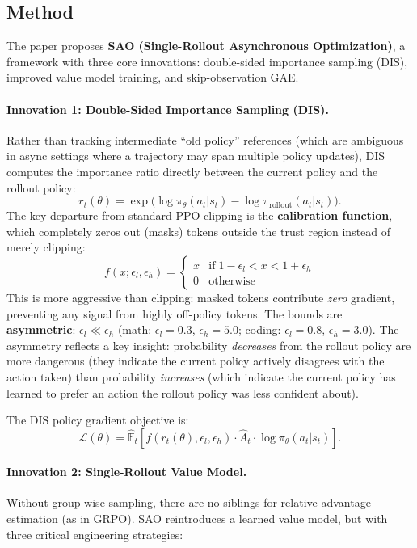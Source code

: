 \documentclass[11pt,a4paper]{article}
\begin{document}
\subsection{Method}

The paper proposes \textbf{SAO (Single-Rollout Asynchronous Optimization)}, a framework with three core innovations: double-sided importance sampling (DIS), improved value model training, and skip-observation GAE.

\paragraph{Innovation 1: Double-Sided Importance Sampling (DIS).} Rather than tracking intermediate ``old policy'' references (which are ambiguous in async settings where a trajectory may span multiple policy updates), DIS computes the importance ratio directly between the current policy and the rollout policy:
\[
r_t(\theta) = \exp\!\big(\log \pi_\theta(a_t | s_t) - \log \pi_{\mathrm{rollout}}(a_t | s_t)\big).
\]
The key departure from standard PPO clipping is the \textbf{calibration function}, which completely zeros out (masks) tokens outside the trust region instead of merely clipping:
\[
f(x; \epsilon_l, \epsilon_h) = \begin{cases} x & \mathrm{if}\; 1 - \epsilon_l < x < 1 + \epsilon_h \\ 0 & \mathrm{otherwise} \end{cases}
\]
This is more aggressive than clipping: masked tokens contribute \emph{zero} gradient, preventing any signal from highly off-policy tokens. The bounds are \textbf{asymmetric}: $\epsilon_l \ll \epsilon_h$ (math: $\epsilon_l = 0.3$, $\epsilon_h = 5.0$; coding: $\epsilon_l = 0.8$, $\epsilon_h = 3.0$). The asymmetry reflects a key insight: probability \emph{decreases} from the rollout policy are more dangerous (they indicate the current policy actively disagrees with the action taken) than probability \emph{increases} (which indicate the current policy has learned to prefer an action the rollout policy was less confident about).

The DIS policy gradient objective is:
\[
\mathcal{L}(\theta) = \hat{\mathbb{E}}_t\!\left[ f(r_t(\theta), \epsilon_l, \epsilon_h) \cdot \hat{A}_t \cdot \log \pi_\theta(a_t | s_t) \right].
\]

\paragraph{Innovation 2: Single-Rollout Value Model.} Without group-wise sampling, there are no siblings for relative advantage estimation (as in GRPO). SAO reintroduces a learned value model, but with three critical engineering strategies:
\end{document}
